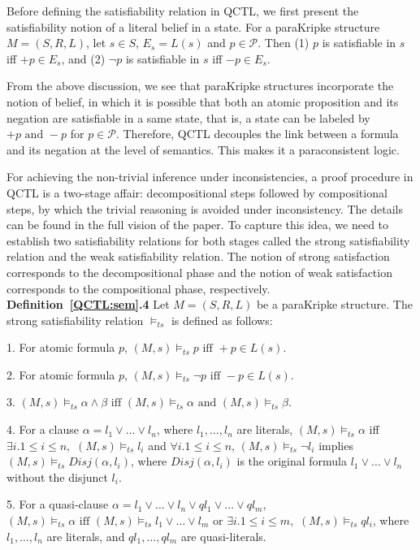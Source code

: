 \documentclass{entcs}
\begin{document}
Before defining the satisfiability relation in QCTL, we first
present the satisfiability notion of a literal belief in a state.
For a paraKripke structure $M=(S,R,L)$, let $s\in S$, $E_s=L(s)$
and $p\in\mathcal{P}$. Then (1) $p$ is satisfiable in $s$ iff
$+p\in E_s$, and (2) $\neg p$ is satisfiable in $s$ iff $-p\in
E_s$.

From the above discussion, we see that paraKripke structures
incorporate the notion of belief, in which it is possible that both
an atomic proposition and its negation are satisfiable in a same
state, that is, a state can be labeled by $+p \mbox{ and }-p $ for
$p\in\mathcal{P}$. Therefore, QCTL decouples the link between a
formula and its negation at the level of semantics. This makes it a
paraconsistent logic.

For achieving the non-trivial inference under inconsistencies, a
proof procedure in QCTL is a two-stage affair: decompositional
steps followed by compositional steps, by which the trivial
reasoning is avoided under inconsistency. The details can be found
in the full vision of the paper. To capture this idea, we need to
establish two satisfiability relations for both stages called the
strong satisfiability relation and the weak satisfiability
relation. The notion of strong satisfaction corresponds to the
decompositional phase and the notion of weak satisfaction
corresponds to the compositional phase, respectively.\\

\noindent\textbf{Definition~\ref{QCTL:sem}.4} Let $M=(S,R,L)$ be a
paraKripke structure. The strong satisfiability relation
$\models_{ts}$ is defined as follows:

 1. For atomic formula $p$, $(M,s)\models_{ts} p  \mbox{ iff } +p\in L(s)$.

 2. For atomic formula $p$, $(M,s)\models_{ts} \neg p\mbox{ iff }
-p\in L(s)$.

 3. $(M,s)\models_{ts} \alpha\wedge\beta\mbox{ iff }
(M,s)\models_{ts}\alpha \mbox{ and } (M,s)\models_{ts}\beta$.

 4. For a clause
 $\alpha=l_1\vee\ldots\vee l_n$, where
 $l_1,\ldots,l_n$ are literals,
 $(M,s)\models_{ts}\alpha$ iff $\exists i.1\le i\le n,$
 $(M,s)\models_{ts}l_i$ and $\forall i.1\leq i\leq n$, $(M,s)\models_{ts} \neg
l_i$ implies $(M,s)\models_{ts} Disj(\alpha,l_i)$, where
$Disj(\alpha,l_i)$ is the original formula $l_1\vee\ldots\vee l
_n$ without the disjunct $l_i$.

 5. For a quasi-clause $\alpha=l_1\vee\ldots\vee l_n\vee
  ql_1\vee\ldots\vee ql_m$, $(M,s)\models_{ts} \alpha\mbox{ iff }
 (M,s)\models_{ts}l_1\vee\ldots\vee l_m
\mbox{ or } \exists i.1\le i\le m,$ $(M,s)\models_{ts} ql_i$,
where $l_1,\ldots,l_n$ are literals, and $ql_1,\ldots,ql_m$ are
quasi-literals.
\end{document}
